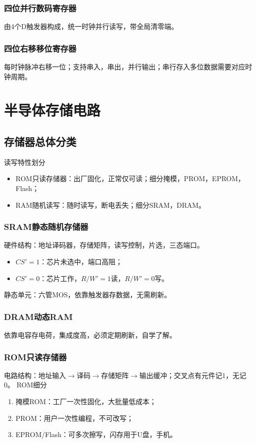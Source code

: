 \subsubsection{四位并行数码寄存器}
由4个D触发器构成，统一时钟并行读写，带全局清零端。

\subsubsection{四位右移移位寄存器}
每时钟脉冲右移一位；支持串入，串出，并行输出；串行存入多位数据需要对应时钟周期。

\section{半导体存储电路}
\subsection{存储器总体分类}
读写特性划分
\begin{itemize}
    \item ROM只读存储器：出厂固化，正常仅可读；细分掩模，PROM，EPROM，Flash；
    \item RAM随机读写：随时读写，断电丢失；细分SRAM，DRAM。
\end{itemize}

\subsubsection{SRAM静态随机存储器}
硬件结构：地址译码器，存储矩阵，读写控制，片选，三态端口。
\begin{itemize}
    \item $CS'=1$：芯片未选中，端口高阻；
    \item $CS'=0$：芯片工作，$R/W'=1$读，$R/W'=0$写。
\end{itemize}
静态单元：六管MOS，依靠触发器存数据，无需刷新。

\subsubsection{DRAM动态RAM}
依靠电容存电荷，集成度高，必须定期刷新，自学了解。

\subsubsection{ROM只读存储器}
电路结构：地址输入$\rightarrow$译码$\rightarrow$存储矩阵$\rightarrow$输出缓冲；交叉点有元件记1，无记0。
ROM细分
\begin{enumerate}
    \item 掩模ROM：工厂一次性固化，大批量低成本；
    \item PROM：用户一次性编程，不可改写；
    \item EPROM/Flash：可多次擦写，闪存用于U盘，手机。
\end{enumerate}


